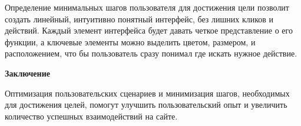 \noindent
\begin{minipage}{\linewidth}
    \centering
\end{minipage}
\bigskip

Определение минимальных шагов пользователя для достижения цели позволит создать линейный, интуитивно понятный интерфейс, без лишних кликов и действий. Каждый элемент интерфейса будет давать четкое представление о его функции, а ключевые элементы можно выделить цветом, размером, и расположением, что бы пользователь сразу понимал где искать нужное действие.

\textbf{Заключение}

Оптимизация пользовательских сценариев и минимизация шагов, необходимых для достижения целей, помогут улучшить пользовательский опыт и увеличить количество успешных взаимодействий на сайте.
\bigskip

